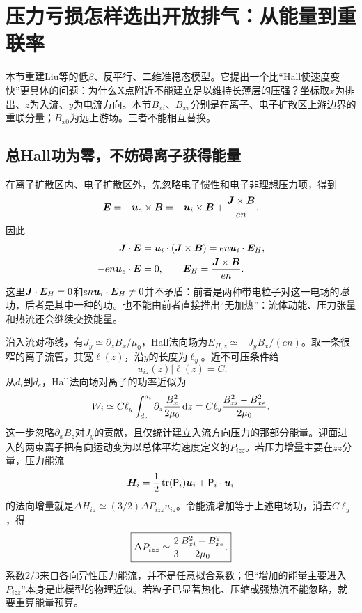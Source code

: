 \section{压力亏损怎样选出开放排气：从能量到重联率}
\label{sec:pressure-rate}
本节重建Liu等的低$\beta$、反平行、二维准稳态模型\citep{F589}。它提出一个比“Hall使速度变快”更具体的问题：为什么X点附近不能建立足以维持长薄层的压强？坐标取$x$为排出、$z$为入流、$y$为电流方向。本节$B_{xi}$、$B_{xe}$分别是在离子、电子扩散区上游边界的重联分量；$B_{x0}$为远上游场。三者不能相互替换。

\subsection{总Hall功为零，不妨碍离子获得能量}
在离子扩散区内、电子扩散区外，先忽略电子惯性和电子非理想压力项，得到
\begin{equation}
 \bm{E}=-\bm{u}_e\times\bm{B}=-\bm{u}_i\times\bm{B}+{\bm{J}\times\bm{B}\over en}.
\end{equation}
因此
\begin{align}
 \bm{J}\cdot\bm{E}&=\bm{u}_i\cdot(\bm{J}\times\bm{B})
             =en\bm{u}_i\cdot\bm{E}_H,\\
 -en\bm{u}_e\cdot\bm{E}&=0,
 \qquad \bm{E}_H={\bm{J}\times\bm{B}\over en}.
\end{align}
这里$\bm{J}\cdot\bm{E}_H=0$和$en\bm{u}_i\cdot\bm{E}_H\ne0$并不矛盾：前者是两种带电粒子对这一电场的\emph{总}功，后者是其中一种的功。也不能由前者直接推出“无加热”：流体动能、压力张量和热流还会继续交换能量。

沿入流对称线，有$J_y\simeq\partial_zB_x/\mu_0$，Hall法向场为$E_{H,z}\simeq-J_yB_x/(en)$。取一条很窄的离子流管，其宽$\ell(z)$，沿$y$的长度为$\ell_y$。近不可压条件给
\begin{equation}
 |u_{iz}(z)|\ell(z)=C.
\end{equation}
从$d_i$到$d_e$，Hall法向场对离子的功率近似为
\begin{equation}
 W_i\simeq C\ell_y\int_{d_e}^{d_i}\partial_z{B_x^2\over2\mu_0}\,\mathrm d z
 =C\ell_y{B_{xi}^2-B_{xe}^2\over2\mu_0}.
\end{equation}
这一步忽略$\partial_xB_z$对$J_y$的贡献，且仅统计建立入流方向压力的那部分能量。迎面进入的两束离子把有向运动变为以总体平均速度定义的$P_{izz}$。若压力增量主要在$zz$分量，压力能流
\begin{equation}
 \bm{H}_i={1\over2}\operatorname{tr}(\mathsf P_i)\bm{u}_i+\mathsf P_i\cdot\bm{u}_i
\end{equation}
的法向增量就是$\Delta H_{iz}\simeq(3/2)\Delta P_{izz}u_{iz}$。令能流增加等于上述电场功，消去$C\ell_y$，得
\begin{equation}
 \boxed{\Delta P_{izz}\simeq{2\over3}{B_{xi}^2-B_{xe}^2\over2\mu_0}.}
 \label{eq:remaining-pressure}
\end{equation}
系数$2/3$来自各向异性压力能流，并不是任意拟合系数；但“增加的能量主要进入$P_{izz}$”本身是此模型的物理近似。若粒子已显著热化、压缩或强热流不能忽略，就要重算能量预算。

